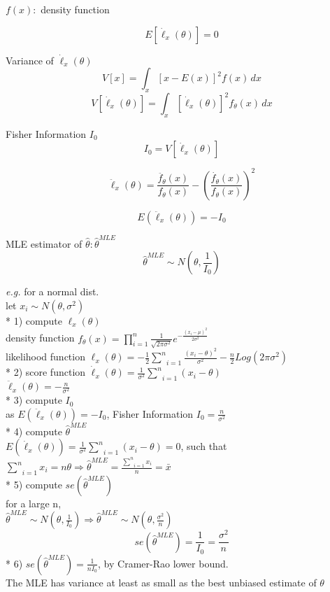 \documentclass[10pt,landscape]{article}
\begin{document}
\begin{multicols}{3}
\begin{multicols}{2}
\pagebreak 
$f(x):$ density function
\end{multicols}
$$ E[\dot{\ell}_x(\theta)] = 0 $$

Variance of $\dot{\ell}_x(\theta)$
$$ V[x] = \int_x \left[x - E(x)\right]^2 f(x)\, dx $$
$$ V[\dot{\ell}_x(\theta)] = \int_x \left[\dot{\ell}_x(\theta)\right]^2 f_{\theta}(x) \, dx $$

Fisher Information $I_0$
$$ I_0 = V[\dot{\ell}_x(\theta)] $$

\begin{multicols}{2}
$$ \ddot{\ell}_x(\theta) = \frac{\ddot{f_{\theta}}(x)}{f_{\theta}(x)} - \left(\frac{\dot{f_{\theta}}(x)}{f_{\theta}(x)}\right)^2 $$

\pagebreak 
$$ E(\ddot{\ell}_x(\theta)) = - I_0 $$
\end{multicols}

MLE estimator of $\hat{\theta} : \hat{\theta}^{MLE}$
$$ \hat{\theta}^{MLE} \sim N\left(\theta,\frac{1}{I_0}\right) $$

\medskip
\emph{e.g.} for a normal dist. \\
let $x_i \sim N(\theta, \sigma^2)$ \\
* 1) compute ${\ell}_x(\theta)$ \\
density function $f_{\theta}(x) = \prod _{i=1}^n \frac{1}{\sqrt{2 \pi \sigma^2}} e^{-\frac{(x_i - \mu)^2}{2 \sigma^2}}$ \\
likelihood function ${\ell}_x(\theta) = -\frac{1}{2} \underset{i=1}{\overset{n}{\sum}} \frac{(x_i - \theta)^2}{\sigma^2} - \frac{n}{2} Log(2 \pi \sigma^2)$ \\
* 2) score function $\dot{\ell}_x(\theta) = \frac{1}{\sigma^2} \underset{i=1}{\overset{n}{\sum}} (x_i - \theta)$ \\
$\ddot{\ell}_x(\theta) = -\frac{n}{\sigma^2}$ \\
* 3) compute $I_0$ \\
as $E(\ddot{\ell}_x(\theta)) = - I_0$, Fisher Information $I_0 = \frac{n}{\sigma^2}$ \\
* 4) compute $\hat{\theta}^{MLE}$ \\
$E(\dot{\ell}_x(\theta)) = \frac{1}{\sigma^2} \underset{i=1}{\overset{n}{\sum}} (x_i - \theta) = 0$, such that \\
$\underset{i=1}{\overset{n}{\sum}} x_i = n \theta \Rightarrow \hat{\theta}^{MLE} = \frac{\underset{i=1}{\overset{n}{\sum}} x_i}{n} = \bar{x}$ \\
* 5) compute $se(\hat{\theta}^{MLE})$ \\
for a large n, \\
$\hat{\theta}^{MLE} \sim N\left(\theta,\frac{1}{I_0}\right) \Rightarrow \hat{\theta}^{MLE} \sim N\left(\theta,\frac{\sigma^2}{n}\right)$
$$ se(\hat{\theta}^{MLE}) = \frac{1}{I_0} = \frac{\sigma^2}{n} $$
* 6) $se(\hat{\theta}^{MLE}) = \frac{1}{n I_0}$, by Cramer-Rao lower bound. \\
The MLE has variance at least as small as the best unbiased estimate of $\theta$


\end{multicols}
\end{document}
